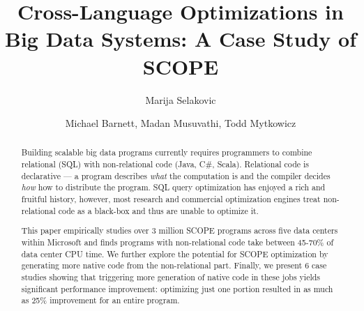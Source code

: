 \documentclass[sigconf]{acmart}
\begin{document}


\title{Cross-Language Optimizations in Big Data Systems: A Case Study of SCOPE}


\author{Marija Selakovic}


\author{Michael Barnett, Madan Musuvathi, Todd Mytkowicz}




\renewcommand{\shortauthors}{M. Selakovic et al.}


\begin{abstract}

  Building scalable big data programs currently requires programmers to combine relational (SQL) with non-relational code (Java, C\#, Scala).
  Relational code is declarative --- a program describes \emph{what} the computation is and the compiler decides \emph{how} how to distribute the program.  SQL query optimization has enjoyed a rich and fruitful history, however, most research and commercial optimization engines treat non-relational code as a black-box and thus are unable to optimize it.

  This paper empirically studies over 3 million SCOPE programs across five data centers within Microsoft and finds programs with non-relational code take between 45-70\% of data center CPU time.
  We further explore the potential for SCOPE optimization by generating more native code from the non-relational part. Finally, we present 6 case studies showing that triggering more generation of native code in these jobs yields significant performance improvement: optimizing just one portion resulted in as much as 25\% improvement for an entire program.

\end{abstract}
\end{document}
